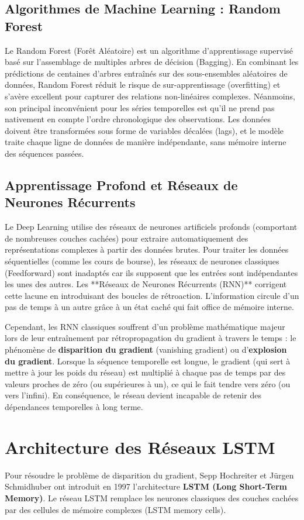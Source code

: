 \subsection{Algorithmes de Machine Learning : Random Forest}
Le Random Forest (Forêt Aléatoire) est un algorithme d'apprentissage supervisé basé sur l'assemblage de multiples arbres de décision (Bagging). En combinant les prédictions de centaines d'arbres entraînés sur des sous-ensembles aléatoires de données, Random Forest réduit le risque de sur-apprentissage (overfitting) et s'avère excellent pour capturer des relations non-linéaires complexes.
Néanmoins, son principal inconvénient pour les séries temporelles est qu'il ne prend pas nativement en compte l'ordre chronologique des observations. Les données doivent être transformées sous forme de variables décalées (lags), et le modèle traite chaque ligne de données de manière indépendante, sans mémoire interne des séquences passées.

\subsection{Apprentissage Profond et Réseaux de Neurones Récurrents}
Le Deep Learning utilise des réseaux de neurones artificiels profonds (comportant de nombreuses couches cachées) pour extraire automatiquement des représentations complexes à partir des données brutes. 
Pour traiter les données séquentielles (comme les cours de bourse), les réseaux de neurones classiques (Feedforward) sont inadaptés car ils supposent que les entrées sont indépendantes les unes des autres. Les **Réseaux de Neurones Récurrents (RNN)** corrigent cette lacune en introduisant des boucles de rétroaction. L'information circule d'un pas de temps à un autre grâce à un état caché qui fait office de mémoire interne.

Cependant, les RNN classiques souffrent d'un problème mathématique majeur lors de leur entraînement par rétropropagation du gradient à travers le temps : le phénomène de \textbf{disparition du gradient} (vanishing gradient) ou d'\textbf{explosion du gradient}. Lorsque la séquence temporelle est longue, le gradient (qui sert à mettre à jour les poids du réseau) est multiplié à chaque pas de temps par des valeurs proches de zéro (ou supérieures à un), ce qui le fait tendre vers zéro (ou vers l'infini). En conséquence, le réseau devient incapable de retenir des dépendances temporelles à long terme.

\section{Architecture des Réseaux LSTM}
Pour résoudre le problème de disparition du gradient, Sepp Hochreiter et Jürgen Schmidhuber ont introduit en 1997 l'architecture \textbf{LSTM (Long Short-Term Memory)}. Le réseau LSTM remplace les neurones classiques des couches cachées par des cellules de mémoire complexes (LSTM memory cells). 

